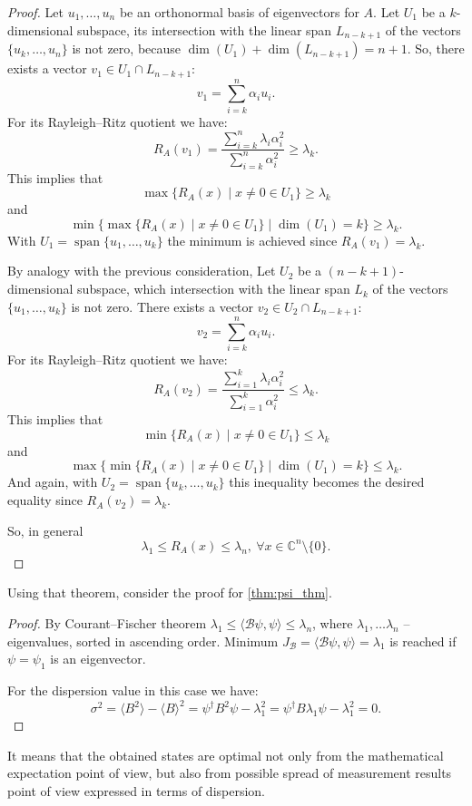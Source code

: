 \documentclass[%
master,         %
subf,           %
href,           %
colorlinks=true %
]{disser}
\DeclareMathOperator{\Span}{span}
\numberwithin{equation}{section}
\numberwithin{figure}{section}
\begin{document}
\begin{proof}
Let $u_1, \ldots, u_n$ be an orthonormal basis of eigenvectors for $A$. Let $U_1$ be a $k$-dimensional subspace, its intersection with the linear span $L_{n-k+1}$ of the vectors $\{u_k, \ldots, u_n\}$ is not zero, because $\dim(U_1) + \dim(L_{n-k+1}) = n+1$. So, there exists a vector $v_1 \in U_1 \cap L_{n-k+1}$: 
\[
v_1 = \sum_{i=k}^n \alpha_i u_i.
\]
For its Rayleigh–Ritz quotient we have:
\[
R_A(v_1) = \frac{\sum_{i=k}^n \lambda_i \alpha_i^2}{\sum_{i=k}^n \alpha_i^2} \geq \lambda_k.
\]
This implies that
\[
\max \{R_A(x)\mid x\neq 0 \in U_1\} \geq \lambda_k
\]
and 
\[
\min\{\max \{R_A(x)\mid x\neq 0 \in U_1\} \mid \dim(U_1) = k \} \geq \lambda_k.
\]
With $U_1 = \Span\{u_1, \ldots, u_k\}$ the minimum is achieved since $R_A(v_1) = \lambda_k$.

By analogy with the previous consideration, Let $U_2$ be a $(n-k+1)$-dimensional subspace, which intersection with the linear span $L_{k}$ of the vectors $\{u_1, \ldots, u_k\}$ is not zero. There exists a vector $v_2 \in U_2 \cap L_{n-k+1}$: 
\[
v_2 = \sum_{i=k}^n \alpha_i u_i.
\]
For its Rayleigh–Ritz quotient we have:
\[
R_A(v_2) = \frac{\sum_{i=1}^k \lambda_i \alpha_i^2}{\sum_{i=1}^k \alpha_i^2} \leq \lambda_k.
\]
This implies that
\[
\min \{R_A(x)\mid x\neq 0 \in U_1\} \leq \lambda_k
\]
and
\[
\max\{\min \{R_A(x)\mid x\neq 0 \in U_1\} \mid \dim(U_1) = k \} \leq \lambda_k.
\]
And again, with $U_2 = \Span\{u_k, \ldots, u_k\}$ this inequality becomes the desired equality since $R_A(v_2) = \lambda_k$.

So, in general 
\[
\lambda_1 \leq R_A(x) \leq \lambda_n, \ \forall x \in \mathbb{C}^n\setminus \{0\}.
\]
\end{proof}

Using that theorem, consider the proof for \ref{thm:psi_thm}.
\begin{proof}
By Courant–Fischer theorem $\lambda_1 \leq \langle\mathcal{B}\psi, \psi\rangle \leq \lambda_n$, where $\lambda_1, \ldots \lambda_n$ -- eigenvalues, sorted in ascending order. Minimum 
$J_\mathcal{B} = \langle\mathcal{B}\psi, \psi\rangle = \lambda_1$ is reached if $\psi = \psi_1$ is an 
eigenvector.

For the dispersion value in this case we have:
\[\sigma^2 = \langle B^2\rangle - \langle B\rangle^2 = \psi^\dagger B^2 \psi - \lambda_1^2 = \psi^\dagger B \lambda_1  \psi - \lambda_1^2 = 0.
\]
\end{proof}

It means that the obtained states are optimal not only from the mathematical expectation point of view, but also from 
possible spread of measurement results point of view expressed in terms of dispersion.
\end{document}
